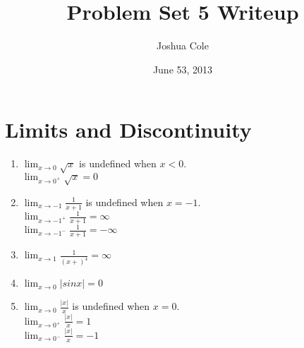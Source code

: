 \documentclass {article}
\begin{document}
\title {Problem Set 5 Writeup}
\author {Joshua Cole}
\date {June 53, 2013}
\maketitle
\section {Limits and Discontinuity}

\begin{enumerate}
\item $\lim_{x \to 0}\sqrt{x}$ is undefined when $x<0$.\\
$\lim_{x \to 0^+}\sqrt{x}=0$

\item $\lim_{x \to -1}\frac{1}{x+1}$ is undefined when $x=-1$.\\
$\lim_{x \to -1^+}\frac{1}{x+1}=\infty$ \\
$\lim_{x \to -1^-}\frac{1}{x+1}=-\infty$ 

\item $\lim_{x \to 1}\frac{1}{(x+)^4}=\infty$

\item $\lim_{x \to 0}|sinx|=0$

\item $\lim_{x \to 0} \frac{|x|}{x}$ is undefined when $x=0$.\\
 $\lim_{x \to 0^+} \frac{|x|}{x}=1$\\
 $\lim_{x \to 0^-} \frac{|x|}{x}=-1$
\end{enumerate}
\end{document}

